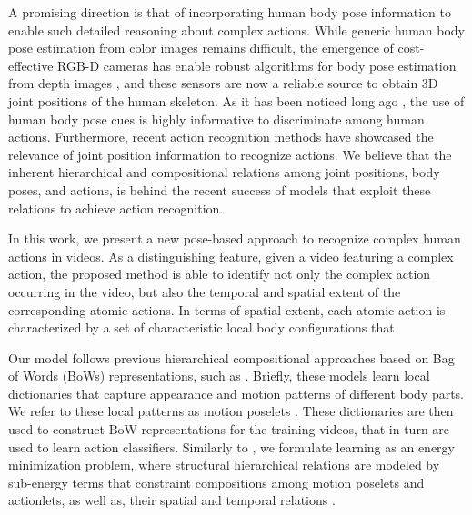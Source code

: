 A promising direction is that of incorporating human body pose information
to enable such detailed reasoning about complex actions.
While generic human body pose estimation from color images remains difficult,
the emergence of cost-effective RGB-D cameras has enable robust
algorithms for body pose estimation from depth images
\cite{Shotton:EtAl:11}, and these sensors are now
a reliable source to obtain 3D joint positions of the human skeleton. 
As it has been noticed long ago \cite{Johansson:1973}, the use of human body
pose cues is highly informative to discriminate among human actions.
Furthermore, recent action recognition methods have
showcased the relevance of joint position information to 
recognize actions\cite{Jhuang:EtAl:2013,Wang:EtAl:2013}. We believe that the 
inherent
hierarchical and compositional relations among joint positions, body poses, and 
actions, is behind the recent success of models that exploit these 
relations to achieve action recognition.

In this work, we present a new pose-based approach to recognize
complex human actions in videos. As a distinguishing feature,
given a video featuring a complex action, the
proposed method is able to identify not only the complex action occurring in the
video, but also the temporal and spatial extent of the corresponding atomic
actions. In terms of spatial extent, each atomic action is characterized by a 
set of characteristic local body configurations that 


Our model follows previous hierarchical compositional approaches based on Bag
of Words (BoWs) representations, such as \cite{Wang2013, 
Lillo2014,Taralova:EtAl:2014,Tao2015}.
Briefly, these models learn local dictionaries that capture
appearance and motion patterns of different body parts. We refer to these local 
patterns as motion poselets \cite{Bourdev:EtAl:2010, Tao2015}. These
dictionaries are then used to construct BoW representations for the training
videos, that in turn are used to learn action classifiers. Similarly to
\cite{Lillo2014, Tao2015}, we formulate learning as an energy minimization
problem, where structural hierarchical relations are modeled by sub-energy
terms that constraint compositions among
motion poselets and actionlets, as well as, their spatial and 
temporal relations
\cite{Lillo2014}.

